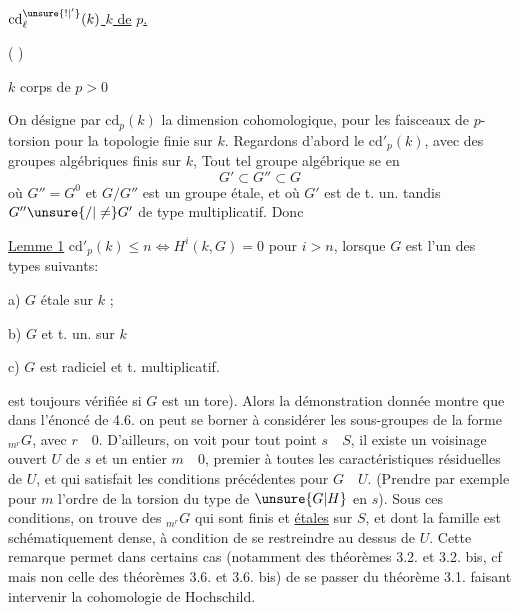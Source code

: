 \uline{$\mathrm{cd}^{\unsure{!|'}}_{\ell}(k)$  $k$ de}
\uline{ $p$.}

( )


$k$ corps de  $p>0$

On désigne par $\mathrm{cd}_p(k)$ la dimension cohomologique,
 pour les faisceaux de $p$-torsion pour la
topologie finie   sur $k$. Regardons d'abord
le $\mathrm{cd}'_p(k)$,  avec des groupes algébriques
 finis sur $k$,  Tout tel groupe algébrique se 
en
\[
G'\subset G''\subset G
\]
où $G''=G^0$ et $G/G''$ est un groupe
étale, et où $G'$ est  de t. un. tandis
$G''\unsure{/|\ne}G'$  de type multiplicatif. Donc

\uline{Lemme 1} $\mathrm{cd}'_p(k)\leq n\Longleftrightarrow H^i(k,G)=0$ pour $i>n$,
lorsque $G$ est  l'un des types suivants:

a) $G$ étale sur $k$ ; 

b) $G$  et t. un. sur $k$

c) $G$ est radiciel et t. multiplicatif.


est toujours vérifiée si $G$ est un tore). Alors la démonstration donnée
montre que dans l'énoncé de 4.6.  on peut se borner à considérer les
sous-groupes de la forme ${}_{m^r}G$, avec $r\quad 0$. D'ailleurs, on voit 
  pour tout point $s\quad S$, il existe un voisinage ouvert $U$ de $s$ 
et un entier $m\quad 0$, premier à toutes les caractéristiques 
résiduelles de $U$, et qui satisfait les conditions précédentes pour $G\quad U$.
(Prendre par exemple pour $m$ l'ordre de la torsion du type de $\unsure{G|H}$ 
en $s$). Sous ces conditions, on trouve des ${}_{m^r}G$ qui sont finis et
\uline{étales} sur $S$, et dont la famille est schématiquement dense, à condition
de se restreindre au dessus de $U$. Cette remarque permet dans certains
cas (notamment   des théorèmes 3.2. et 3.2. bis, cf
mais non celle des théorèmes 3.6. et 3.6. bis) de se passer du théorème 3.1. faisant intervenir la cohomologie de Hochschild. 

